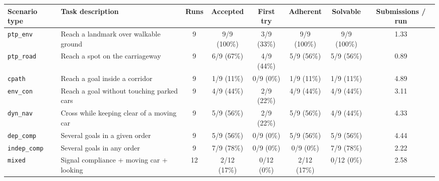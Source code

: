 \documentclass[border=10pt,12pt]{standalone}
\begin{document}
\renewcommand{\arraystretch}{1.35}
\begin{tabular}{@{}l l c c c c c c@{}}
\toprule
\textbf{Scenario type} & \textbf{Task description} & \textbf{Runs} & \textbf{Accepted} & \textbf{First try} & \textbf{Adherent} & \textbf{Solvable} & \textbf{Submissions / run} \\
\midrule
\texttt{ptp\_env} & Reach a landmark over walkable ground & 9 & 9/9 (100\%) & 3/9 (33\%) & 9/9 (100\%) & 9/9 (100\%) & 1.33 \\
\texttt{ptp\_road} & Reach a spot on the carriageway & 9 & 6/9 (67\%) & 4/9 (44\%) & 5/9 (56\%) & 5/9 (56\%) & 0.89 \\
\texttt{cpath} & Reach a goal inside a corridor & 9 & 1/9 (11\%) & 0/9 (0\%) & 1/9 (11\%) & 1/9 (11\%) & 4.89 \\
\texttt{env\_con} & Reach a goal without touching parked cars & 9 & 4/9 (44\%) & 2/9 (22\%) & 4/9 (44\%) & 4/9 (44\%) & 3.11 \\
\texttt{dyn\_nav} & Cross while keeping clear of a moving car & 9 & 5/9 (56\%) & 2/9 (22\%) & 5/9 (56\%) & 4/9 (44\%) & 4.33 \\
\texttt{dep\_comp} & Several goals in a given order & 9 & 5/9 (56\%) & 0/9 (0\%) & 5/9 (56\%) & 5/9 (56\%) & 4.44 \\
\texttt{indep\_comp} & Several goals in any order & 9 & 7/9 (78\%) & 0/9 (0\%) & 0/9 (0\%) & 7/9 (78\%) & 2.22 \\
\texttt{mixed} & Signal compliance + moving car + looking & 12 & 2/12 (17\%) & 0/12 (0\%) & 2/12 (17\%) & 0/12 (0\%) & 2.58 \\
\bottomrule
\end{tabular}
\end{document}
